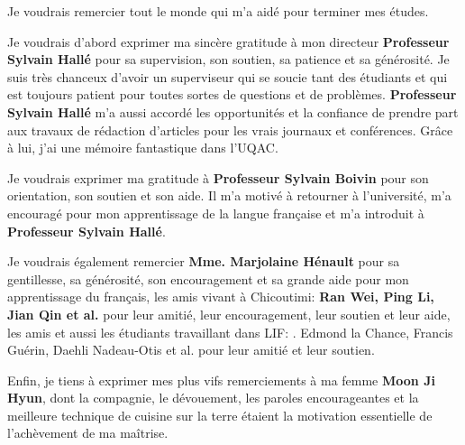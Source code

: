 
\begin{acknowledgements}

Je voudrais remercier tout le monde qui m'a aidé pour terminer mes études.

Je voudrais d'abord exprimer ma sincère gratitude à mon directeur \textbf{Professeur Sylvain Hallé} pour sa supervision, son soutien, sa patience et sa générosité. Je suis très chanceux d'avoir un superviseur qui se soucie tant des étudiants et qui est toujours patient pour toutes sortes de questions et de problèmes. \textbf{Professeur Sylvain Hallé} m'a aussi accordé les opportunités et la confiance de prendre part aux travaux de rédaction d'articles pour les vrais journaux et conférences. Grâce à lui, j'ai une mémoire fantastique dans l'UQAC.

Je voudrais exprimer ma gratitude à \textbf{Professeur Sylvain Boivin} pour son orientation, son soutien et son aide. Il m'a motivé à retourner à l'université, m'a encouragé pour mon apprentissage de la langue française et m'a introduit à \textbf{Professeur Sylvain Hallé}.

Je voudrais également remercier \textbf{Mme. Marjolaine Hénault} pour sa gentillesse, sa générosité, son encouragement et sa grande aide pour mon apprentissage du français, les amis vivant à Chicoutimi: \textbf{Ran Wei, Ping Li, Jian Qin et al.} pour leur amitié, leur encouragement, leur soutien et leur aide, les amis et aussi les étudiants travaillant dans LIF: {. Edmond la Chance, Francis Guérin, Daehli Nadeau-Otis et al.} pour leur amitié et leur soutien.

Enfin, je tiens à exprimer mes plus vifs remerciements à ma femme \textbf {Moon Ji Hyun}, dont la compagnie, le dévouement, les paroles encourageantes et la meilleure technique de cuisine sur la terre étaient la motivation essentielle de l'achèvement de ma maîtrise.

\end{acknowledgements}